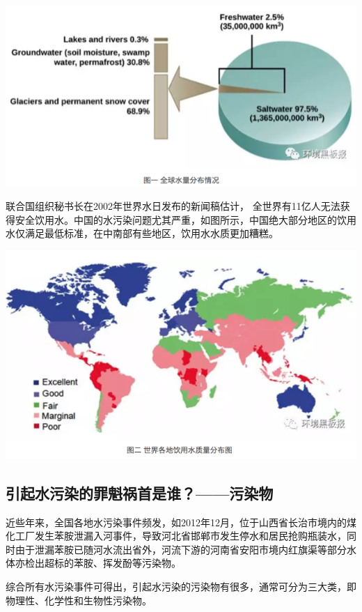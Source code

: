 \documentclass[]{book}
\begin{document}
\includegraphics[width=8.33in]{images/dushui1}

联合国组织秘书长在2002年世界水日发布的新闻稿估计， 全世界有11亿人无法获得安全饮用水。中国的水污染问题尤其严重，如图所示，中国绝大部分地区的饮用水仅满足最低标准，在中南部有些地区，饮用水水质更加糟糕。

\includegraphics[width=8.33in]{images/dushui2}

\hypertarget{ux5f15ux8d77ux6c34ux6c61ux67d3ux7684ux7f6aux9b41ux7978ux9996ux662fux8c01ux6c61ux67d3ux7269}{%
\subsection{引起水污染的罪魁祸首是谁？------污染物}\label{ux5f15ux8d77ux6c34ux6c61ux67d3ux7684ux7f6aux9b41ux7978ux9996ux662fux8c01ux6c61ux67d3ux7269}}

近些年来，全国各地水污染事件频发，如2012年12月，位于山西省长治市境内的煤化工厂发生苯胺泄漏入河事件，导致河北省邯郸市发生停水和居民抢购瓶装水，同时由于泄漏苯胺已随河水流出省外，河流下游的河南省安阳市境内红旗渠等部分水体亦检出超标的苯胺、挥发酚等污染物。

综合所有水污染事件可得出，引起水污染的污染物有很多，通常可分为三大类，即物理性、化学性和生物性污染物。
\end{document}
